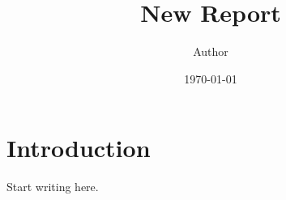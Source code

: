 \documentclass{report}
\title{New Report}
\author{Author}
\date{\today}
\begin{document}
\maketitle
\tableofcontents

\chapter{Introduction}

Start writing here.
\end{document}
